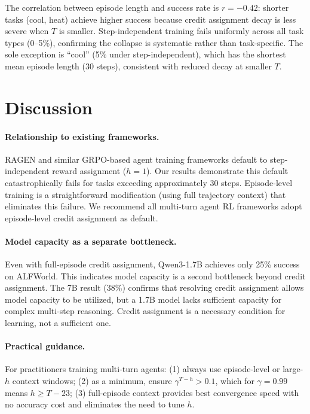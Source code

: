 \documentclass[11pt]{article}
\begin{document}
The correlation between episode length and success rate is $r = -0.42$: shorter tasks (cool, heat) achieve higher success because credit assignment decay is less severe when $T$ is smaller. Step-independent training fails uniformly across all task types (0--5\%), confirming the collapse is systematic rather than task-specific. The sole exception is ``cool'' (5\% under step-independent), which has the shortest mean episode length (30 steps), consistent with reduced decay at smaller $T$.

\section{Discussion}

\paragraph{Relationship to existing frameworks.}
RAGEN and similar GRPO-based agent training frameworks default to step-independent reward assignment ($h=1$). Our results demonstrate this default catastrophically fails for tasks exceeding approximately 30 steps. Episode-level training is a straightforward modification (using full trajectory context) that eliminates this failure. We recommend all multi-turn agent RL frameworks adopt episode-level credit assignment as default.

\paragraph{Model capacity as a separate bottleneck.}
Even with full-episode credit assignment, Qwen3-1.7B achieves only 25\% success on ALFWorld. This indicates model capacity is a second bottleneck beyond credit assignment. The 7B result (38\%) confirms that resolving credit assignment allows model capacity to be utilized, but a 1.7B model lacks sufficient capacity for complex multi-step reasoning. Credit assignment is a necessary condition for learning, not a sufficient one.

\paragraph{Practical guidance.}
For practitioners training multi-turn agents: (1) always use episode-level or large-$h$ context windows; (2) as a minimum, ensure $\gamma^{T-h} > 0.1$, which for $\gamma=0.99$ means $h \geq T - 23$; (3) full-episode context provides best convergence speed with no accuracy cost and eliminates the need to tune $h$.
\end{document}
